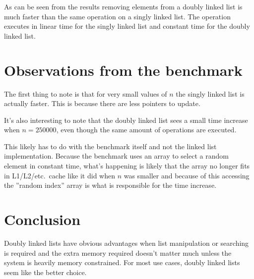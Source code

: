 \documentclass[a4paper,11pt]{article}
\begin{document}
\begin{table}[H]
\centering
{}
\end{table}

As can be seen from the results removing elements from a doubly linked list is much faster than the same operation on a singly linked list.
The operation executes in linear time for the singly linked list and constant time for the doubly linked list.

\section*{Observations from the benchmark}

The first thing to note is that for very small values of $n$ the singly linked list is actually faster. This is because there are less pointers to update.

It's also interesting to note that the doubly linked list sees a small time increase when $n=250000$, even though the same amount of operations are executed.

This likely has to do with the benchmark itself and not the linked list implementation.
Because the benchmark uses an array to select a random element in constant time, what's happening is likely that the array no longer fits in L1/L2/etc.\ cache like it did when $n$ was smaller and because of this accessing the ''random index'' array is what is responsible for the time increase.

\section*{Conclusion}

Doubly linked lists have obvious advantages when list manipulation or searching is required and the extra memory required doesn't matter much unless the system is heavily memory constrained.
For most use cases, doubly linked lists seem like the better choice.
\end{document}
